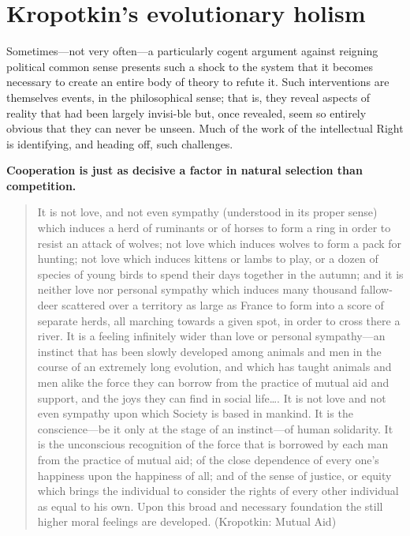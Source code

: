 \documentclass[
]{book}
\begin{document}
\hypertarget{kropotkins-evolutionary-holism}{%
\section{Kropotkin's evolutionary holism}\label{kropotkins-evolutionary-holism}}

Sometimes---not very often---a particularly cogent argument against reigning political common sense presents such a shock to the system that it becomes necessary to create an entire body of theory to refute it. Such interventions are themselves events, in the philosophical sense; that is, they reveal aspects of reality that had been largely invisi-ble but, once revealed, seem so entirely obvious that they can never be unseen. Much of the work of the intellectual Right is identifying, and heading off, such challenges.

\textbf{Cooperation is just as decisive a factor in natural selection than competition.}

\begin{quote}
It is not love, and not even sympathy (understood in its proper sense) which induces a herd of ruminants or of horses to form a ring in order to resist an attack of wolves; not love which induces wolves to form a pack for hunting; not love which induces kittens or lambs to play, or a dozen of species of young birds to spend their days together in the autumn; and it is neither love nor personal sympathy which induces many thousand fallow-deer scattered over a territory as large as France to form into a score of separate herds, all marching towards a given spot, in order to cross there a river. It is a feeling infinitely wider than love or personal sympathy---an instinct that has been slowly developed among animals and men in the course of an extremely long evolution, and which has taught animals and men alike the force they can borrow from the practice of mutual aid and support, and the joys they can find in social life\ldots. It is not love and not even sympathy upon which Society is based in mankind. It is the conscience---be it only at the stage of an instinct---of human solidarity. It is the unconscious recognition of the force that is borrowed by each man from the practice of mutual aid; of the close dependence of every one's happiness upon the happiness of all; and of the sense of justice, or equity which brings the individual to consider the rights of every other individual as equal to his own. Upon this broad and necessary foundation the still higher moral feelings are developed.
(Kropotkin: Mutual Aid)
\end{quote}
\end{document}
